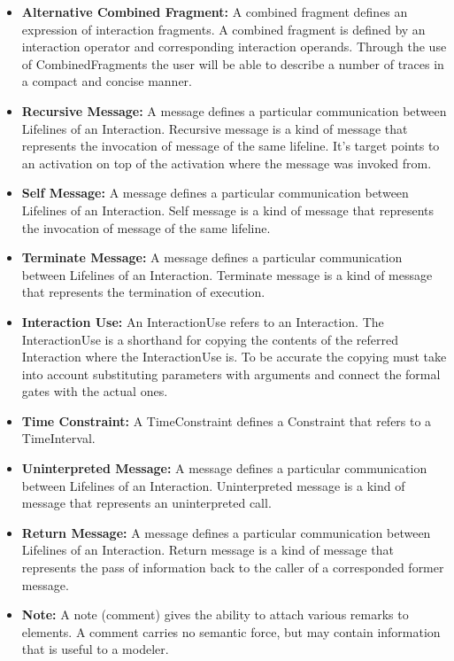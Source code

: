 \begin{itemize}
	\item \textbf{Alternative Combined Fragment:} A combined fragment defines an expression of interaction fragments. A combined fragment is defined by an interaction operator and corresponding interaction operands. Through the use of CombinedFragments the user will be able to describe a number of traces in a compact and concise manner.
	
	\item \textbf{Recursive Message:} A message defines a particular communication between Lifelines of an Interaction. Recursive message is a kind of message that represents the invocation of message of the same lifeline. It's target points to an activation on top of the activation where the message was invoked from.
	
	\item \textbf{Self Message:} A message defines a particular communication between Lifelines of an Interaction. Self message is a kind of message that represents the invocation of message of the same lifeline.
	
	\item \textbf{Terminate Message:} A message defines a particular communication between Lifelines of an Interaction. Terminate message is a kind of message that represents the termination of execution.
	
	\item \textbf{Interaction Use:} An InteractionUse refers to an Interaction. The InteractionUse is a shorthand for copying the contents of the referred Interaction where the InteractionUse is. To be accurate the copying must take into account substituting parameters with arguments and connect the formal gates with the actual ones.
	
	\item \textbf{Time Constraint:} A TimeConstraint defines a Constraint that refers to a TimeInterval.
	
	\item \textbf{Uninterpreted Message:} A message defines a particular communication between Lifelines of an Interaction. Uninterpreted message is a kind of message that represents an uninterpreted call.
	
	\item \textbf{Return Message:} A message defines a particular communication between Lifelines of an Interaction. Return message is a kind of message that represents the pass of information back to the caller of a corresponded former message.
	
	\item \textbf{Note:} A note (comment) gives the ability to attach various remarks to elements. A comment carries no semantic force, but may contain information that is useful to a modeler.	
	
\end{itemize}

